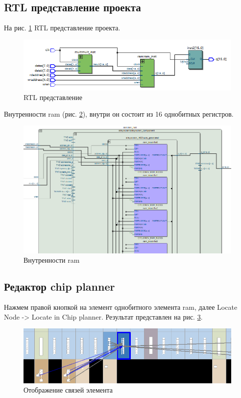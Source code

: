 \documentclass[a4paper,14pt]{article}
\begin{document}
\subsection{RTL представление проекта}

На рис. \ref{fig:screenshot015} RTL представление проекта.

\begin{figure}[H]
	\centering
	\includegraphics[width=0.7\linewidth]{image/lab5/screenshot015}
	\caption{RTL представление}
	\label{fig:screenshot015}
\end{figure}

Внутренности ram (рис. \ref{fig:screenshot016}), внутри он состоит из 16 однобитных регистров.

\begin{figure}[H]
	\centering
	\includegraphics[width=0.7\linewidth]{image/lab5/screenshot016}
	\caption{Внутренности ram}
	\label{fig:screenshot016}
\end{figure}

\subsection{Редактор chip planner}

Нажмем правой кнопкой на элемент однобитного элемента ram, далее Locate Node -> Locate in Chip planner. 
Результат представлен на рис. \ref{fig:screenshot017}.

\begin{figure}[H]
	\centering
	\includegraphics[width=0.7\linewidth]{image/lab5/screenshot017}
	\caption{Отображение связей элемента}
	\label{fig:screenshot017}
\end{figure}
\end{document}
